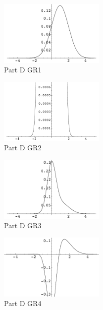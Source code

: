 \documentclass[11pt]{article}
\begin{document}
\begin{figure}[htbp] %
   \centering
   \includegraphics[width=2in]{partD_gr1.pdf} 
   \caption{Part D GR1}
   \label{fig:example1}
\end{figure}

\begin{figure}[htbp] %
   \centering
   \includegraphics[width=2in]{partD_gr2.pdf} 
   \caption{Part D GR2}
   \label{fig:example2}
\end{figure}


\begin{figure}[htbp] %
   \centering
   \includegraphics[width=2in]{partD_gr3.pdf} 
   \caption{Part D GR3}
   \label{fig:example3}
\end{figure}

\begin{figure}[htbp] %
   \centering
   \includegraphics[width=2in]{partD_gr4.pdf} 
   \caption{Part D GR4}
   \label{fig:example4}
\end{figure}




\end{document}
